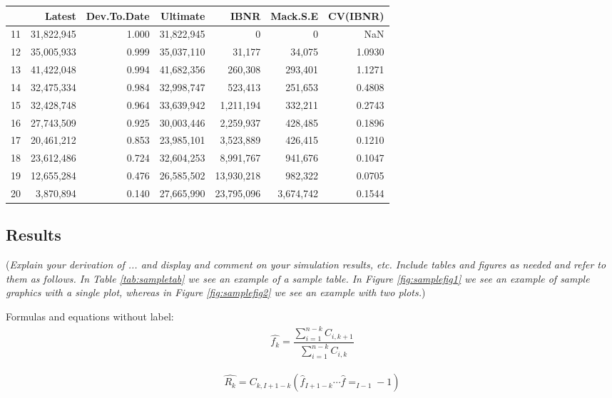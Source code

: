 \documentclass[a4paper]{article}
\begin{document}
\begin{table}[ht]
\centering
\begin{tabular}{rrrrrrr}
      & Latest& Dev.To.Date&   Ultimate&       IBNR&  Mack.S.E& CV(IBNR) \\
  \hline
11& 31,822,945&       1.000& 31,822,945&          0&         0&      NaN\\
12 &35,005,933 &      0.999& 35,037,110&     31,177&    34,075&   1.0930\\
13 &41,422,048   &    0.994& 41,682,356&    260,308&   293,401 &  1.1271\\
14& 32,475,334 &      0.984& 32,998,747&    523,413 &  251,653&   0.4808\\
15& 32,428,748   &    0.964& 33,639,942& 1,211,194   &332,211 &  0.2743\\
16& 27,743,509  &     0.925 &30,003,446&  2,259,937 &  428,485&   0.1896\\
17& 20,461,212   &    0.853& 23,985,101&  3,523,889 &  426,415 &  0.1210\\
18 &23,612,486   &    0.724 &32,604,253&  8,991,767 &  941,676&   0.1047\\
19 &12,655,284  &     0.476& 26,585,502& 13,930,218 &  982,322&   0.0705\\
20&  3,870,894  &     0.140& 27,665,990& 23,795,096 &3,674,742&   0.1544\\
   \hline
\end{tabular}
\end{table}

\subsection*{Results}

({\it Explain your derivation of ... and display and comment on your simulation results, etc. Include tables and figures as needed and refer to them as follows. In Table \ref{tab:sampletab} we see an example of a sample table. In Figure \ref{fig:samplefig1} we see an example of sample graphics with a single plot, whereas in Figure \ref{fig:samplefig2} we see an example with two plots.}) 

Formulas and equations without label:
\begin{align*}
	\hat{f_k} = \dfrac{\sum_{i=1}^{n-k} C_{i,k+1}} {\sum_{i=1}^{n-k} C_{i,k}}
\end{align*}

\begin{align*}
	\hat{R_k} = C_{k,I+1-k} \left(  \hat{f}_{I+1-k} \cdots \hat{f}=_{I-1}-1\right)
\end{align*}
\end{document}
